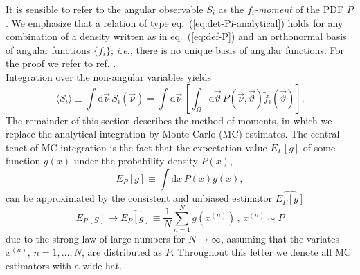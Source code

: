 \documentclass[aps,nofootinbib,preprintnumbers,prd,twocolumn]{revtex4-1}
\newcommand{\dual}[1]{\tilde{#1}}
\newcommand{\est}[1]{\widehat{#1}}
\newcommand{\ie}{\textit{i.e.}}
\newcommand{\nuvec}{\vec{\nu}}
\newcommand{\refeq}[1]{eq.~(\ref{eq:#1})}
\newcommand{\rmdx}[1]{\mbox{d} #1 \,} %
\newcommand{\thvec}{\vec{\vartheta}}
\renewcommand{\theta}{\vartheta}
\begin{document}
It is sensible to refer to the angular observable $S_i$ as the
\emph{$f_i$-moment} of the PDF $P$.  We emphasize that a relation of
type \refeq{det-Pi-analytical} holds for any combination of a density
written as in \refeq{def-P} and an orthonormal basis of angular
functions $\lbrace f_i \rbrace$; \ie, there is no unique
basis of angular functions. For the proof we refer to ref. \cite{Dighe:1998vk}.\\

Integration over the non-angular variables yields
\begin{equation}
    \langle S_i\rangle
    \equiv \int \rmdx{\vec\nu} S_i(\nuvec)
    = \int \rmdx{\vec \nu} \left[\int_{\Omega} \rmdx{\vec \theta} P(\nuvec,\thvec) \dual{f}_i(\thvec) \right].
\end{equation}
The remainder of this section describes the method of moments, in
which we replace the analytical integration by Monte Carlo (MC)
estimates.  The central tenet of MC integration is the fact that the
expectation value $E_P[g]$ of some function $g(x)$ under the
probability density $P(x)$,
\begin{equation}
    E_P[g] \equiv \int \rmdx{x} P(x) g(x),
\end{equation}
can be approximated by the consistent and unbiased
estimator $\est{E_P[g]}$~\cite[sec. 8.2]{James:2006zz}
\begin{equation}
    \label{eq:mc-id}
    E_P[g] \to \widehat{E_P[g]} \equiv \frac{1}{N} \sum_{n=1}^N g(x^{(n)}) \,,\,    x^{(n)} \sim P
\end{equation}
due to the strong law of large numbers for $N \to \infty$, assuming
that the variates $x^{(n)}$, $n = 1, \dots, N$, are distributed as
$P$.
Throughout this letter we denote all MC estimators with a wide hat.\\
\end{document}

